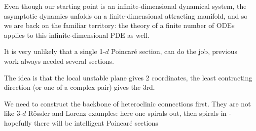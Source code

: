 \bigskip

Even though our starting point  is an infinite-dimensional
dynamical system, the asymptotic dynamics unfolds on a
finite-dimensional attracting manifold, and so we are back on the
familiar territory: the theory of a finite number of ODEs applies to
this infinite-dimensional PDE as well.

\bigskip

It is very unlikely that a single 1-$d$ Poincar\'e section, can
do the job, previous work always needed
several sections.

The idea is that the local unstable plane gives 2 coordinates, the
least contracting direction (or one of a complex pair) gives the 3rd.

We need to construct the backbone of heteroclinic connections
first. They are not like 3-$d$ R\"ossler and Lorenz examples:
here one spirals out,
then spirals in - hopefully there will be intelligent Poincar\'e sections
